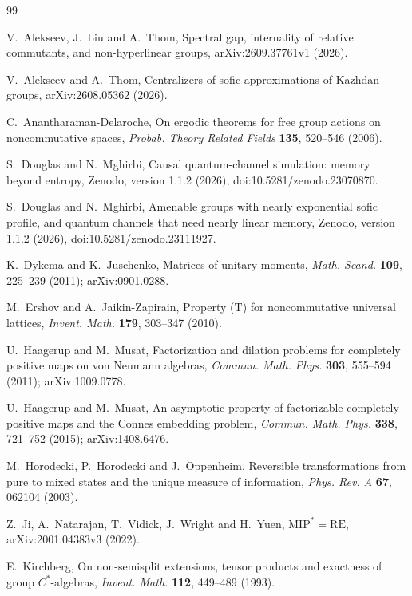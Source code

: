 \documentclass[11pt]{article}
\begin{document}
\begin{thebibliography}{99}

V.~Alekseev, J.~Liu and A.~Thom,
Spectral gap, internality of relative commutants, and non-hyperlinear groups,
arXiv:2609.37761v1 (2026).

V.~Alekseev and A.~Thom,
Centralizers of sofic approximations of Kazhdan groups,
arXiv:2608.05362 (2026).

C.~Anantharaman-Delaroche,
On ergodic theorems for free group actions on noncommutative spaces,
\emph{Probab. Theory Related Fields} \textbf{135}, 520--546 (2006).

S.~Douglas and N.~Mghirbi,
Causal quantum-channel simulation: memory beyond entropy,
Zenodo, version 1.1.2 (2026), doi:10.5281/zenodo.23070870.

S.~Douglas and N.~Mghirbi,
Amenable groups with nearly exponential sofic profile, and quantum channels that need nearly linear memory,
Zenodo, version 1.1.2 (2026), doi:10.5281/zenodo.23111927.

K.~Dykema and K.~Juschenko,
Matrices of unitary moments,
\emph{Math. Scand.} \textbf{109}, 225--239 (2011); arXiv:0901.0288.

M.~Ershov and A.~Jaikin-Zapirain,
Property (T) for noncommutative universal lattices,
\emph{Invent. Math.} \textbf{179}, 303--347 (2010).

U.~Haagerup and M.~Musat,
Factorization and dilation problems for completely positive maps on von Neumann algebras,
\emph{Commun. Math. Phys.} \textbf{303}, 555--594 (2011); arXiv:1009.0778.

U.~Haagerup and M.~Musat,
An asymptotic property of factorizable completely positive maps and the Connes embedding problem,
\emph{Commun. Math. Phys.} \textbf{338}, 721--752 (2015); arXiv:1408.6476.

M.~Horodecki, P.~Horodecki and J.~Oppenheim,
Reversible transformations from pure to mixed states and the unique measure of information,
\emph{Phys. Rev. A} \textbf{67}, 062104 (2003).

Z.~Ji, A.~Natarajan, T.~Vidick, J.~Wright and H.~Yuen,
$\mathrm{MIP}^*=\mathrm{RE}$,
arXiv:2001.04383v3 (2022).

E.~Kirchberg,
On non-semisplit extensions, tensor products and exactness of group $C^*$-algebras,
\emph{Invent. Math.} \textbf{112}, 449--489 (1993).


\end{thebibliography}
\end{document}
